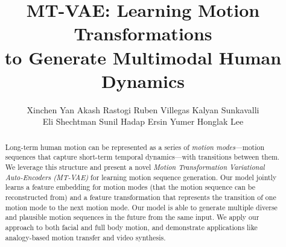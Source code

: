 \documentclass[runningheads]{llncs}
\newcommand{\cutabstractup}{\vspace*{-0.2in}}
\newcommand{\cutabstractdown}{\vspace*{-0.2in}}
\newcommand{\cutsectionup}{\vspace*{-0.2in}}
\begin{document}
\title{MT-VAE: Learning Motion Transformations \\ to Generate Multimodal Human Dynamics}




\author{
  Xinchen Yan \quad Akash Rastogi \quad Ruben Villegas \quad Kalyan Sunkavalli\\ 
  Eli Shechtman \quad
  Sunil Hadap \quad Ersin Yumer \quad Honglak Lee\\
}




\maketitle              

\begin{abstract}
\cutabstractup
Long-term human motion can be represented as a series of \emph{motion modes}---motion sequences that capture short-term temporal dynamics---with transitions between them.
We leverage this structure and present a novel \emph{Motion Transformation Variational Auto-Encoders (MT-VAE)} for learning motion sequence generation.
Our model jointly learns a feature embedding for motion modes (that the motion sequence can be reconstructed from) and a feature transformation that represents the transition of one motion mode to the next motion mode.
Our model is able to generate multiple diverse and plausible motion sequences in the future from the same input.
We apply our approach to both facial and full body motion, and demonstrate applications like analogy-based motion transfer and video synthesis.
\cutabstractdown
\end{abstract}

\cutsectionup
\end{document}
